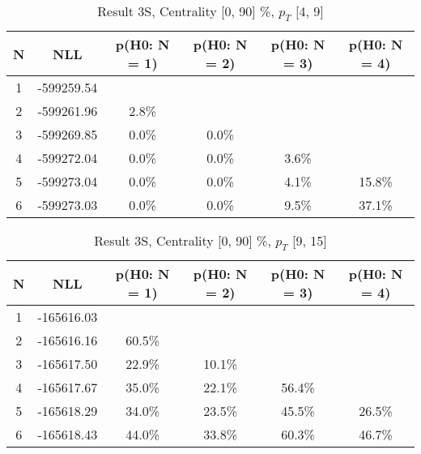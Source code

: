 \begin{table}[htb]
	\begin{center}
	\caption{Result 3S, Centrality [0, 90] \%, $p_{T}$ [4, 9] \GeV
}
{\footnotesize\renewcommand{\arraystretch}{1.4}
		\begin{tabular}{cc||ccc>{\columncolor[gray]{0.8}}c}
			N & NLL & p(H0: N = 1) & p(H0: N = 2) & p(H0: N = 3) & p(H0: N = 4)\\ 
		\hline
1 & -599259.54 & & & &\\
2 & -599261.96 & 2.8\% & & &\\
3 & -599269.85 & 0.0\% & 0.0\% & &\\
4 & -599272.04 & 0.0\% & 0.0\% & 3.6\% &\\
5 & -599273.04 & 0.0\% & 0.0\% & 4.1\% & 15.8\%\\
6 & -599273.03 & 0.0\% & 0.0\% & 9.5\% & 37.1\% \\
	\end{tabular}
		\label{tab:lab}
	}
	\end{center}\end{table}

\begin{table}[htb]
	\begin{center}
	\caption{Result 3S, Centrality [0, 90] \%, $p_{T}$ [9, 15] \GeV
}
{\footnotesize\renewcommand{\arraystretch}{1.4}
		\begin{tabular}{cc||>{\columncolor[gray]{0.8}}cccc}
			N & NLL & p(H0: N = 1) & p(H0: N = 2) & p(H0: N = 3) & p(H0: N = 4)\\ 
		\hline
1 & -165616.03 & & & &\\
2 & -165616.16 & 60.5\% & & &\\
3 & -165617.50 & 22.9\% & 10.1\% & &\\
4 & -165617.67 & 35.0\% & 22.1\% & 56.4\% &\\
5 & -165618.29 & 34.0\% & 23.5\% & 45.5\% & 26.5\%\\
6 & -165618.43 & 44.0\% & 33.8\% & 60.3\% & 46.7\% \\
	\end{tabular}
		\label{tab:lab}
	}
	\end{center}\end{table}

